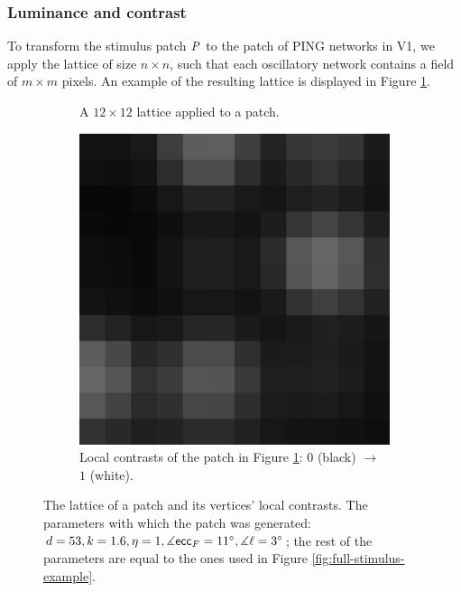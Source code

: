 \subsubsection{Luminance and contrast}

To transform the stimulus patch $P$ to the patch of PING networks in V1, we apply the lattice of size $n \times n$, such that each oscillatory network contains a field of $m \times m$ pixels. An example of the resulting lattice is displayed in Figure \ref{fig:llc-lattice-example}.


\begin{figure}[!htp]
    \centering
    \begin{subfigure}[t]{0.4\textwidth}
        \centering
        
        \caption{A $12 \times 12$ lattice applied to a patch.}
        \label{fig:llc-lattice-example}
    \end{subfigure}
    \hspace{0.06\textwidth}
    \begin{subfigure}[t]{0.4\textwidth}
        \centering
        \includegraphics[width=\textwidth]{src/assets/images/local-contrast.png}
        \caption{Local contrasts of the patch in Figure \ref{fig:llc-lattice-example}: $0$ (black) $\to$ $1$ (white).}
        \label{fig:llc-local-contrast-example}
    \end{subfigure}
    \caption[Patch lattice and local contrast]{The lattice of a patch and its vertices' local contrasts. The parameters with which the patch was generated: $d = 53, k = 1.6, \eta = 1, \measuredangle \mathsf{ecc}_F = 11^\circ, \measuredangle \ell = 3^\circ$; the rest of the parameters are equal to the ones used in Figure \ref{fig:full-stimulus-example}.}
    \label{fig:lattice-local-contrast-example}
\end{figure}


